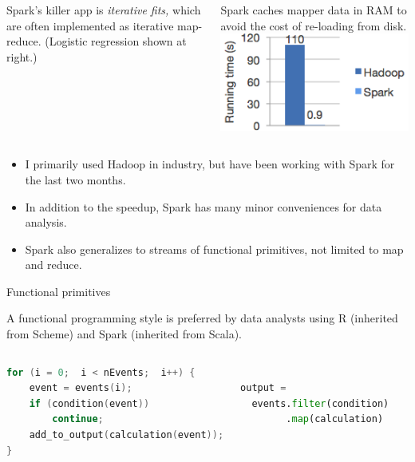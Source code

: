 \documentclass{beamer}
\begin{document}
\begin{frame}{}
\begin{columns}
Spark's killer app is {\it iterative fits,} which are often implemented as iterative map-reduce. (Logistic regression shown at right.)

\vspace{0.2 cm}
Spark caches mapper data in RAM to avoid the cost of re-loading from disk.
\includegraphics[width=\linewidth]{spark_time.png}
\end{columns}

\vfill
\begin{itemize}
\item I primarily used Hadoop in industry, but have been working with Spark for the last two months.
\item In addition to the speedup, Spark has many minor conveniences for data analysis.
\item Spark also generalizes to streams of functional primitives, not limited to map and reduce.
\end{itemize}
\end{frame}

\begin{frame}[fragile]{Functional primitives}

A functional programming style is preferred by data analysts using R (inherited from Scheme) and Spark (inherited from Scala).

\begin{columns}
\begin{lstlisting}[language=c,frame=single]
for (i = 0;  i < nEvents;  i++) {
    event = events(i);
    if (condition(event))
        continue;
    add_to_output(calculation(event));
}
\end{lstlisting}
\begin{lstlisting}[language=python,frame=single]

output =
  events.filter(condition)
        .map(calculation)


\end{lstlisting}
\end{columns}





\end{frame}
\end{document}
